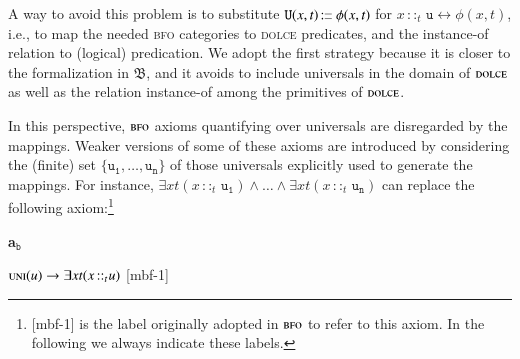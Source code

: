 \documentclass[ao]{iosart2x}
\newcommand{\nb}[1]{\textcolor{red}{$|$}\marginpar{\hspace*{-0cm}\parbox{20mm}{\scriptsize\raggedright\textcolor{red}{#1}}}}
\newcommand{\bflist}{\begin{list}{}{\setlength{\topsep}{2mm}\setlength{\parsep}{0mm}\setlength{\leftmargin}{9.2mm}\setlength{\labelwidth}{8mm}}}
\newcommand{\eflist}{\end{list}}
\newcommand{\bfoAxLabel}{\textrm{a$_\texttt{b}$}}
\newcommand{\dbDefLabel}{\textrm{d$_\texttt{db}$}}
\newcounter{cntaxb}
\newcommand{\bfoax}[1]{\refstepcounter{cntaxb}\begin{small}{\bf \bfoAxLabel\thecntaxb\label{#1}}\end{small}}
\newcounter{cntax}
\newcommand{\refbfoax}[1]{({\bfoAxLabel}\ref{#1})}
\newcommand{\refdbdf}[1]{({\dbDefLabel}\ref{#1})}
\newcommand{\pr}[1]{\mathtt{#1}}
\newcommand{\cn}[1]{\mathtt{#1}}
\newcommand{\ifif}{\leftrightarrow}
\newcommand\textequal{%
 \rule[.08ex]{5pt}{0.35pt}\llap{\rule[.78ex]{5pt}{0.35pt}}}
\newcommand{\sdef}{{\hspace{1.5pt}:\hspace{-2.5pt}\textequal\hspace{3pt}}}
\newcommand{\dolce}{{\textsc{dolce}}}
\newcommand{\bfo}{{\textsc{bfo}}}
\newcommand {\thbfo} {\ensuremath{\mathfrak{B}}}
\newcommand{\procbcat}{\cn{proc}}
\newcommand{\bfouniv}{\textsc{uni}}
\newcommand{\bfoiof}[1]{{\,::_{#1\:\!}}}
\begin{document}
A way to avoid this problem is to substitute $\pr{U}(x,t) \sdef \phi(x,t)$ for $x \bfoiof{t} \cn{u} \ifif \phi(x,t)$, i.e., to map the needed {\bfo} categories to {\dolce} predicates, and the instance-of relation to (logical) predication. %
We adopt the first strategy because it is closer to the formalization in $\thbfo$, and it avoids
to include universals in the domain of {$\dolce$} as well as the relation instance-of among the primitives of {$\dolce$}.

In this perspective, {$\bfo$} axioms quantifying over universals %
are disregarded by the mappings. Weaker versions of some of these axioms are introduced by considering the (finite) set $\{\cn{u_1}, \dots, \cn{u_n}\}$ of those universals explicitly used to generate the mappings. For instance, $\exists xt(x \bfoiof{t} \cn{u_1}) \land \ldots \land \exists xt(x \bfoiof{t} \cn{u_n})$ can replace  the following axiom:\footnote{[mbf-1] is the label originally adopted in $\bfo$ to refer to this axiom. In the following we always indicate these labels.}
%
\bflist
\item[\bfoax{univ_are_insta}] $\bfouniv(u) \to \exists xt(x \bfoiof{t} u)$ \hfill {\scriptsize [mbf-1]}
\eflist

%
\end{document}
